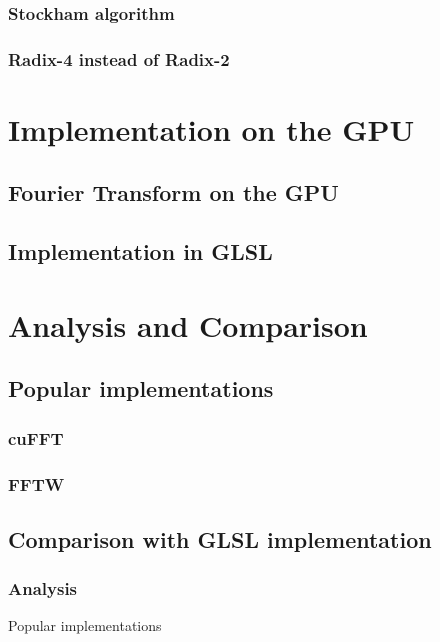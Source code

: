 \documentclass[
  oneside,
  11pt, a4paper,
  footinclude=true,
  headinclude=true,
  cleardoublepage=empty
]{scrbook}
\begin{document}
\subsection{Stockham algorithm}
\subsection{Radix-4 instead of Radix-2}


\chapter{Implementation on the GPU}
\section{Fourier Transform on the GPU}
\section{Implementation in GLSL}

\chapter{Analysis and Comparison}
\section{Popular implementations}
\subsection{cuFFT}
\subsection{FFTW}
\section{Comparison with GLSL implementation}
\subsection{Analysis}
Popular implementations
\end{document}
